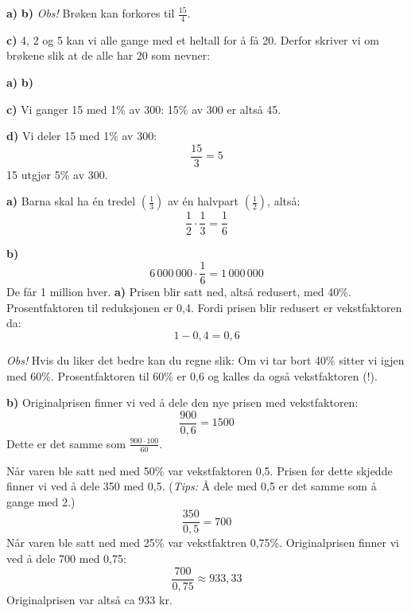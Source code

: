 \inl
\textbf{a)} \vs {}
\textbf{b)} \vs {}
\textsl{Obs!} Brøken kan forkores til $ \frac{15}{4} $. \vsk

\textbf{c)} 4, 2 og 5 kan vi alle gange med et heltall for å få 20. Derfor skriver vi om brøkene slik at de alle har 20 som nevner: 

\inl
\textbf{a)}\vs {}
\textbf{b)}\vs {}

\textbf{c)} Vi ganger 15 med 1\% av 300: 
15\% av 300 er altså 45.\vsk

\textbf{d)} Vi deler 15 med 1\% av 300:
\[ \frac{15}{3}=5 \]
15 utgjør 5\% av 300.

\inl
\textbf{a)} Barna skal ha én tredel $\left( \frac{1}{3}\right) $ av én halvpart $\left( \frac{1}{2}\right) $, altså:
\[ \frac{1}{2}\cdot\frac{1}{3}=\frac{1}{6} \]

\textbf{b)} \[ 6\,000\,000\cdot \frac{1}{6}=1\,000\,000 \]
De får 1 million hver.
\newpage
\inl
\textbf{a)} Prisen blir satt ned, altså redusert, med 40\%. Prosentfaktoren til reduksjonen er 0,4. Fordi prisen blir redusert er vekstfaktoren da:
\[ 1-0,4=0,6 \]

\textsl{Obs!} Hvis du liker det bedre kan du regne slik: Om vi tar bort 40\% sitter vi igjen med 60\%. Prosentfaktoren til 60\% er 0,6 og kalles da også vekstfaktoren (!).\vsk

\textbf{b)} Originalprisen finner vi ved å dele den nye prisen med vekstfaktoren:
\[ \frac{900}{0,6}=1500 \]
\obs Dette er det samme som $ \frac{900\cdot100}{60} $.

\inl
Når varen ble satt ned med 50\% var vekstfaktoren 0,5. Prisen før dette skjedde finner vi ved å dele 350 med 0,5. (\textsl{Tips:} Å dele med 0,5 er det samme som å gange med 2.)
\[ \frac{350}{0,5}=700 \]
Når varen ble satt ned med 25\% var vekstfaktren 0,75\%. Originalprisen finner vi ved å dele 700 med 0,75:
\[ \frac{700}{0,75}\approx 933,33 \]
Originalprisen var altså ca 933 kr. 



